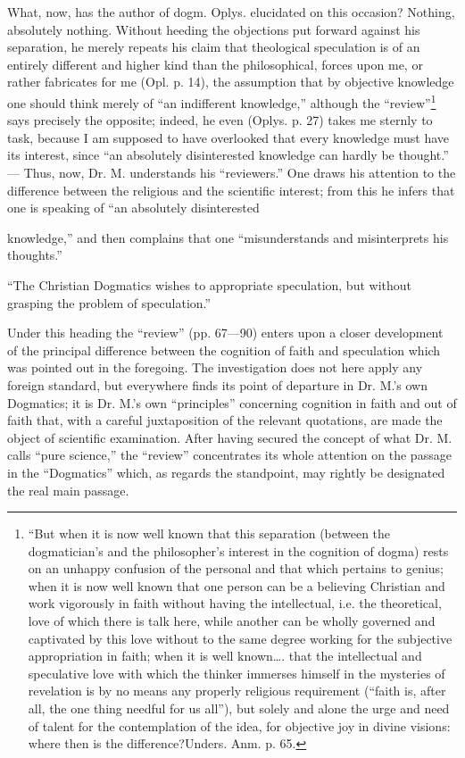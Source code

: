 \documentclass[12pt,a4paper,openany]{book}
\newcommand{\opage}[1]{\marginnote{\footnotesize\textit{[#1]}}}
\begin{document}
What, now, has the author of dogm. Oplys. elucidated on this
occasion? Nothing, absolutely nothing. Without heeding the objections
put forward against his separation, he merely repeats
his claim that theological speculation is of an entirely
different and higher kind than the philosophical, forces upon me, or
rather fabricates for me (Opl. p. 14), the assumption that by
objective knowledge one should think merely of ``an indifferent
knowledge,'' although the ``review''\footnote[1]{``But when it is now well known that this separation (between the dogmatician's and the philosopher's interest in the cognition of dogma) rests on an unhappy confusion of the personal and that which pertains to genius; when it is now well known that one person can be a believing Christian and work vigorously in faith without having the intellectual, i.e. the theoretical, love of which there is talk here, while another can be wholly governed and captivated by this love without to the same degree working for the subjective appropriation in faith; when it is well known\dots{}. that the intellectual and speculative love with which the thinker immerses himself in the mysteries of revelation is by no means any properly religious requirement (``faith is, after all, the one thing needful for us all''), but solely and alone the urge and need of talent for the contemplation of the idea, for objective joy in divine visions: where then is the difference?\hfill Unders. Anm. p. 65.} says precisely the opposite; %
indeed, he even (Oplys. p. 27) takes me sternly to task,
because I am supposed to have overlooked that every knowledge must
have its interest, since ``an absolutely disinterested knowledge can hardly
be thought.'' --- Thus, now, Dr. M. understands his
``reviewers.'' One draws his attention to the difference
between the religious and the scientific interest; from this
he infers that one is speaking of ``an absolutely disinterested

\setcounter{footnote}{0}%
\opage{52}knowledge,'' and then complains that one ``misunderstands and misinterprets
his thoughts.''

``The Christian Dogmatics wishes to appropriate speculation,
but without grasping the problem of speculation.''

Under this heading the ``review'' (pp. 67—90) enters
upon a closer development of the principal difference
between the cognition of faith and speculation which was pointed out in the foregoing. The investigation does not here apply any
foreign standard, but everywhere finds its point of departure in
Dr. M.'s own Dogmatics; it is Dr. M.'s own ``principles''
concerning cognition in faith and out of faith that, with
a careful juxtaposition of the relevant quotations,
are made the object of scientific examination. After
having secured the concept of what Dr. M. calls ``pure
science,'' the ``review'' concentrates its whole attention
on the passage in the ``Dogmatics'' which, as regards the standpoint,
may rightly be designated the real main passage.
\end{document}
